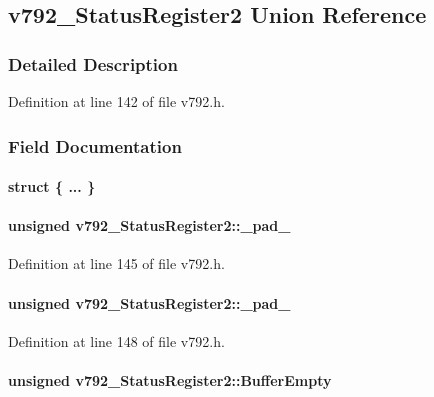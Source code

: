 \subsection{v792\_\-StatusRegister2 Union Reference}
\label{unionv792__StatusRegister2}


\subsubsection{Detailed Description}


Definition at line 142 of file v792.h.

\subsubsection{Field Documentation}
\paragraph[{"@4}]{\setlength{\rightskip}{0pt plus 5cm}struct \{ ... \} }\hfill\label{unionv792__StatusRegister2_adbe20c61fc60d020ebfb01459e82ab99}
\paragraph[{\_\-pad\_\-1}]{\setlength{\rightskip}{0pt plus 5cm}unsigned {\bf v792\_\-StatusRegister2::\_\-pad\_}}\hfill\label{unionv792__StatusRegister2_adb9ef51da77d21e9ba067553db0b13ef}


Definition at line 145 of file v792.h.
\paragraph[{\_\-pad\_\-2}]{\setlength{\rightskip}{0pt plus 5cm}unsigned {\bf v792\_\-StatusRegister2::\_\-pad\_}}\hfill\label{unionv792__StatusRegister2_ac967d30d7e224adae1d6c15513ef9378}


Definition at line 148 of file v792.h.
\paragraph[{BufferEmpty}]{\setlength{\rightskip}{0pt plus 5cm}unsigned {\bf v792\_\-StatusRegister2::BufferEmpty}}\hfill\label{unionv792__StatusRegister2_aa770dd5e8a715ca168d6a33b8ef3fd67}


